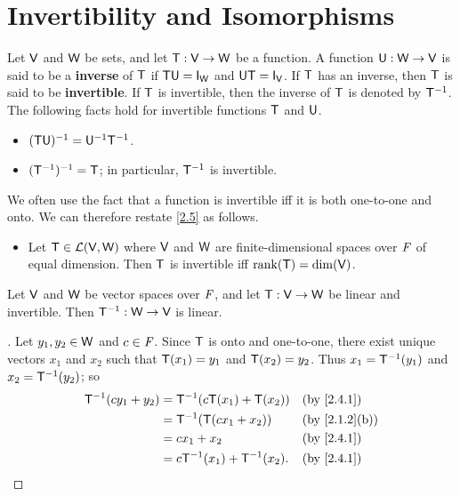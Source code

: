 \section{Invertibility and Isomorphisms}\label{sec:2.4}

\begin{defn}\label{2.4.1}
  Let \(\mathsf{V}\) and \(\mathsf{W}\) be sets, and let \(\mathsf{T} : \mathsf{V} \to \mathsf{W}\) be a function.
  A function \(\mathsf{U} : \mathsf{W} \to \mathsf{V}\) is said to be a \textbf{inverse} of \(\mathsf{T}\) if \(\T \U = \IT[\W]\) and \(\U \T = \IT[\V]\).
  If \(\mathsf{T}\) has an inverse, then \(\mathsf{T}\) is said to be \textbf{invertible}.
  If \(\mathsf{T}\) is invertible, then the inverse of \(\mathsf{T}\) is denoted by \(\mathsf{T}^{-1}\).
  The following facts hold for invertible functions \(\mathsf{T}\) and \(\mathsf{U}\).
  \begin{itemize}
    \item \((\mathsf{T} \mathsf{U})^{-1} = \mathsf{U}^{-1} \mathsf{T}^{-1}\).
    \item \((\mathsf{T}^{-1})^{-1} = \mathsf{T}\);
          in particular, \(\mathsf{T}^{-1}\) is invertible.
  \end{itemize}
  We often use the fact that a function is invertible iff it is both one-to-one and onto.
  We can therefore restate \cref{2.5} as follows.
  \begin{itemize}
    \item Let \(\mathsf{T} \in \mathcal{L}(\mathsf{V}, \mathsf{W})\) where \(\mathsf{V}\) and \(\mathsf{W}\) are finite-dimensional spaces over \(\mathit{F}\) of equal dimension.
          Then \(\mathsf{T}\) is invertible iff \(\rk{\T} = \dim(\V)\).
  \end{itemize}
\end{defn}

\begin{thm}\label{2.17}
  Let \(\mathsf{V}\) and \(\mathsf{W}\) be vector spaces over \(\mathit{F}\), and let \(\mathsf{T} : \mathsf{V} \to \mathsf{W}\) be linear and invertible.
  Then \(\mathsf{T}^{-1} : \mathsf{W} \to \mathsf{V}\) is linear.
\end{thm}

\begin{proof}[]
  Let \(y_1, y_2 \in \mathsf{W}\) and \(c \in \mathit{F}\).
  Since \(\mathsf{T}\) is onto and one-to-one, there exist unique vectors \(x_1\) and \(x_2\) such that \(\mathsf{T}(x_1) = y_1\) and \(\mathsf{T}(x_2) = y_2\).
  Thus \(x_1 = \mathsf{T}^{-1}(y_1)\) and \(x_2 = \mathsf{T}^{-1}(y_2)\);
  so
  \begin{align*}
    \T^{-1}(c y_1 + y_2) & = \T^{-1}(c \T(x_1) + \T(x_2))   &  & \text{(by \cref{2.4.1})}    \\
                         & = \T^{-1}(\T(c x_1 + x_2))       &  & \text{(by \cref{2.1.2}(b))} \\
                         & = c x_1 + x_2                    &  & \text{(by \cref{2.4.1})}    \\
                         & = c \T^{-1}(x_1) + \T^{-1}(x_2). &  & \text{(by \cref{2.4.1})}
  \end{align*}
\end{proof}

